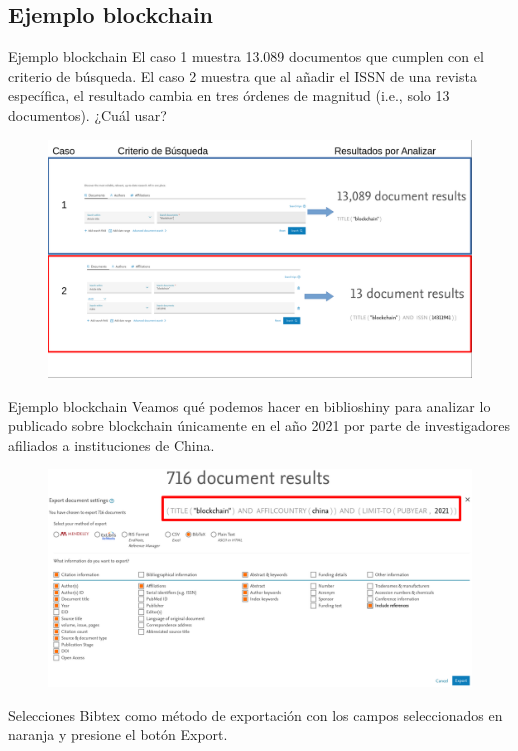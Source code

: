 \documentclass{beamer}
\begin{document}
\subsection{Ejemplo blockchain}
\begin{frame}{Ejemplo blockchain}
El caso 1 muestra 13.089 documentos que cumplen con el criterio de búsqueda. El caso 2 muestra que al añadir el ISSN de una revista específica, el resultado cambia en tres órdenes de magnitud (i.e., solo 13 documentos). ¿Cuál usar?
\begin{figure}
\centering
\includegraphics[width=.85\textwidth]{Caso34.png}
\end{figure}  
\end{frame}

\begin{frame}{Ejemplo blockchain}
Veamos qué podemos hacer en biblioshiny para analizar lo publicado sobre blockchain únicamente en el año 2021 por parte de investigadores afiliados a instituciones de China.
\begin{figure}
\centering
\includegraphics[width=.75\textwidth]{blockchainChina2021.png}
\end{figure}  
Selecciones Bibtex como método de exportación con los campos seleccionados en naranja y presione el botón Export.
\end{frame}
\end{document}
